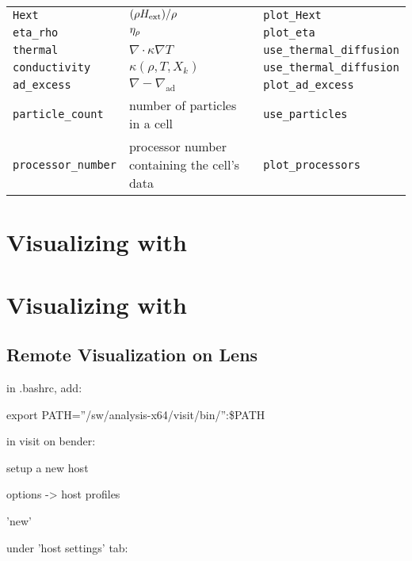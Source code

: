 {\begin{center}
\begin{longtable}{|l|p{2.25in}|p{2.5in}|}
{\tt Hext}             & $(\rho {H_{\rm ext}})/\rho$ & {\tt plot\_Hext} \\
{\tt eta\_rho}         & $\eta_{\rho}$ & {\tt plot\_eta} \\
{\tt thermal}          & $\nabla \cdot \kappa \nabla T$ & {\tt use\_thermal\_diffusion} \\
{\tt conductivity}     & $\kappa(\rho, T, X_k)$ & {\tt use\_thermal\_diffusion} \\
{\tt ad\_excess}       & $\nabla - \nabla_\mathrm{ad}$ & {\tt plot\_ad\_excess} \\
{\tt particle\_count}  & number of particles in a cell & {\tt use\_particles} \\
{\tt processor\_number} & processor number containing the cell's data & {\tt plot\_processors} \\
\end{longtable}
\end{center}
}

\renewcommand{\arraystretch}{1.0}


\section{Visualizing with \amrvis}


\section{Visualizing with \visit}

\subsection{Remote Visualization on Lens}

in .bashrc, add:

export PATH=''/sw/analysis-x64/visit/bin/'':\$PATH


in visit on bender:

setup a new host

   options -> host profiles

      'new'

   under 'host settings' tab:

